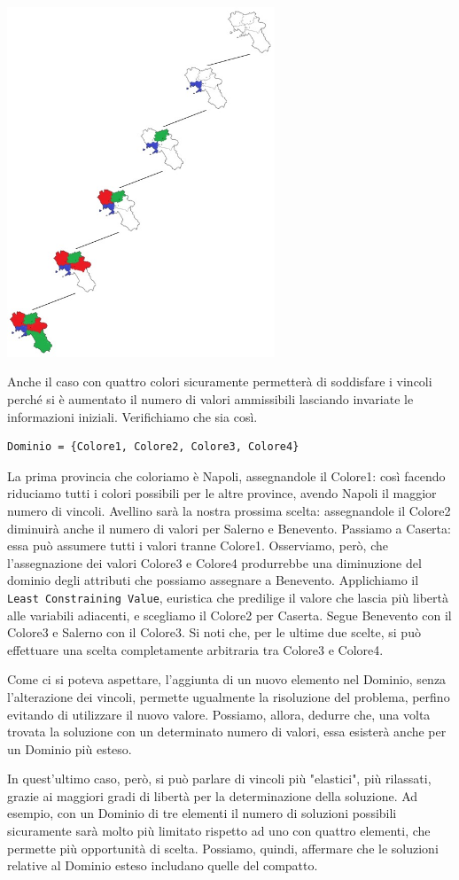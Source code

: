 		\begin{center}
			\includegraphics[width=0.6\textwidth, height=0.4\textheight]{SearchTree.jpg}
		\end{center}\par
		Anche il caso con quattro colori sicuramente permetterà di soddisfare i vincoli perché si è aumentato il numero di valori ammissibili lasciando invariate le informazioni iniziali. Verifichiamo che sia così.
		\begin{lstlisting}
Dominio = {Colore1, Colore2, Colore3, Colore4}
		\end{lstlisting}
		La prima provincia che coloriamo è Napoli, assegnandole il Colore1: così facendo riduciamo tutti i colori possibili per le altre province, avendo Napoli il maggior numero di vincoli. Avellino sarà la nostra prossima scelta: assegnandole il Colore2 diminuirà anche il numero di valori per Salerno e Benevento. Passiamo a Caserta: essa può assumere tutti i valori tranne Colore1. Osserviamo, però, che l'assegnazione dei valori Colore3 e Colore4 produrrebbe una diminuzione del dominio degli attributi che possiamo assegnare a Benevento. Applichiamo il \texttt{Least Constraining Value}, euristica che predilige il valore che lascia più libertà alle variabili adiacenti, e scegliamo il Colore2 per  Caserta. Segue Benevento con il Colore3 e Salerno con il Colore3. Si noti che, per le ultime due scelte, si può effettuare una scelta completamente arbitraria tra Colore3 e Colore4.\par
		Come ci si poteva aspettare, l'aggiunta di un nuovo elemento nel Dominio, senza l'alterazione dei vincoli, permette ugualmente la risoluzione del problema, perfino evitando di utilizzare il nuovo valore. Possiamo, allora, dedurre che, una volta trovata la soluzione con un determinato numero di valori, essa esisterà anche per un Dominio più esteso.\par 
		In quest'ultimo caso, però, si può parlare di vincoli più "elastici", più rilassati, grazie ai maggiori gradi di libertà per la determinazione della soluzione. Ad esempio, con un Dominio di tre elementi il numero di soluzioni possibili sicuramente sarà molto più limitato rispetto ad uno con quattro elementi, che permette più opportunità di scelta. Possiamo, quindi, affermare che le soluzioni relative al Dominio esteso includano quelle del compatto. 
